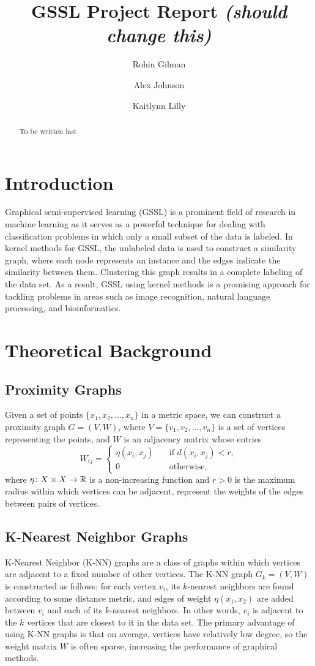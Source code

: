 \documentclass[12pt]{amsart}
\title{GSSL Project Report \emph{(should change this)}}
\author{Rohin Gilman \and Alex Johnson \and Kaitlynn Lilly}
\begin{document}
\begin{abstract}
	To be written last
\end{abstract}

\maketitle

\section{Introduction} 
Graphical semi-supervised learning (GSSL) is a prominent field of research in machine learning as it serves as a powerful technique for dealing with classification problems in which only a small subset of the data is labeled. In kernel methods for GSSL, the unlabeled data is used to construct a similarity graph, where each node represents an instance and the edges indicate the similarity between them. Clustering this graph results in a complete labeling of the data set. As a result, GSSL using kernel methods is a promising approach for tackling problems in areas such as image recognition, natural language processing, and bioinformatics.

\section{Theoretical Background}

\subsection{Proximity Graphs}
Given a set of points $\{x_1, x_2, \dots, x_n\}$ in a metric space, we can construct a proximity graph $G = (V, W)$, where $V = \{v_1, v_2, \dots, v_n\}$ is a set of vertices representing the points, and $W$ is an adjacency matrix whose entries 
\[W_{ij} = \begin{cases}
  \eta(x_i,x_j) \quad&\text{if } d(x_i,x_j) < r, \\
  0 \quad&\text{otherwise},
\end{cases}\]
where $\eta\colon X\times X \to \mathbb{R}$ is a non-increasing function and $r > 0$ is the maximum radius within which vertices can be adjacent, represent the weights of the edges between pairs of vertices.
\subsection{K-Nearest Neighbor Graphs}
K-Nearest Neighbor (K-NN) graphs are a class of graphs within which vertices are adjacent to a fixed number of other vertices. The K-NN graph $G_k = (V, W)$ is constructed as follows: for each vertex $v_i$, its $k$-nearest neighbors are found according to some distance metric, and edges of weight $\eta(x_1,x_2)$ are added between $v_i$ and each of its $k$-nearest neighbors. In other words, $v_i$ is adjacent to the $k$ vertices that are closest to it in the data set. The primary advantage of using K-NN graphs is that on average, vertices have relatively low degree, so the weight matrix $W$ is often sparse, increasing the performance of graphical methods.
\end{document}
